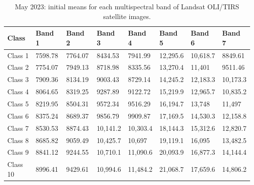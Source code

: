 \documentclass[geomatics,article,accept,pdftex,oneauthor]{Definitions/mdpi}
\begin{document}
\begin{table}[H]
\caption{May 2023: initial means for each multispectral band of Landsat OLI/TIRS satellite images.}\label{tabA03}
\begin{tabularx}{\textwidth}{ p{1.5cm}  X  X  X  X  X  X  X  }
\toprule \textbf{Class} & \textbf{Band 1} & \textbf{Band 2} & \textbf{Band 3} & \textbf{Band 4} & \textbf{Band 5} & \textbf{Band 6} & \textbf{Band 7} \\  \midrule
    Class 1 & 7598.78 & 7764.07 & 8434.53 & 7941.99 & 12,295.6 & 10,618.7 & 8849.61 \\
    Class 2 & 7754.07 & 7949.13 & 8718.98 & 8335.56 & 13,270.4 & 11,401 & 9511.46 \\
    Class 3 & 7909.36 & 8134.19 & 9003.43 & 8729.14 & 14,245.2 & 12,183.3 & 10,173.3 \\
    Class 4 & 8064.65 & 8319.25 & 9287.89 & 9122.72 & 15,219.9 & 12,965.7 & 10,835.2 \\
    Class 5 & 8219.95 & 8504.31 & 9572.34 & 9516.29 & 16,194.7 & 13,748 & 11,497 \\
    Class 6 & 8375.24 & 8689.37 & 9856.79 & 9909.87 & 17,169.5 & 14,530.3 & 12,158.8 \\
    Class 7 & 8530.53 & 8874.43 & 10,141.2 & 10,303.4 & 18,144.3 & 15,312.6 & 12,820.7 \\
    Class 8 & 8685.82 & 9059.49 & 10,425.7 & 10,697 & 19,119.1 & 16,095 & 13,482.5 \\
    Class 9 & 8841.12 & 9244.55 & 10,710.1 & 11,090.6 & 20,093.9 & 16,877.3 & 14,144.4 \\
    Class 10 & 8996.41 & 9429.61 & 10,994.6 & 11,484.2 & 21,068.7 & 17,659.6 & 14,806.2 \\
    \bottomrule
\end{tabularx}
\label{tabA03}
\end{table}
\vspace{-6pt}
\end{document}
